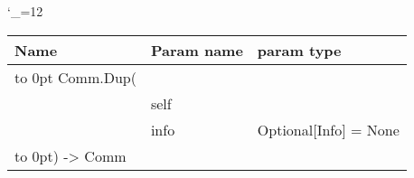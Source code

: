 \begingroup \catcode`\_=12 \tt
\begin{tabular}{lll}
\toprule
\textrm{Name}&\textrm{Param name}&\textrm{param type}\\
\midrule
\hbox to 0pt {Comm.Dup(\hss}\\
& self\\
& info & Optional[Info] = None\\
\hbox to 0pt{) -> Comm\hss}\\
\bottomrule
\end{tabular}
\endgroup
